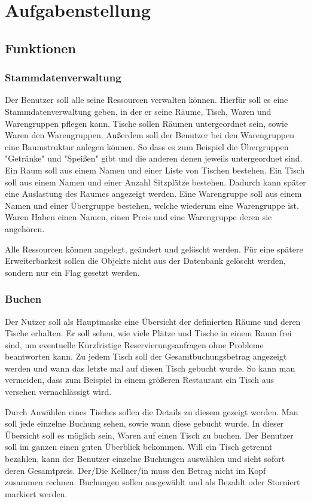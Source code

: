 \section{Aufgabenstellung}

\subsection{Funktionen}

\subsubsection{Stammdatenverwaltung}

Der Benutzer soll alle seine Ressourcen verwalten können. Hierfür soll es eine Stammdatenverwaltung geben, in der er seine Räume, Tisch, Waren und Warengruppen pflegen kann. Tische sollen Räumen untergeordnet sein, sowie Waren den Warengruppen. Außerdem soll der Benutzer bei den Warengruppen eine Baumstruktur anlegen können. So dass es zum Beispiel die Übergruppen "Getränke" und "Speißen" gibt und die anderen denen jeweils untergeordnet sind. Ein Raum soll aus einem Namen und einer Liste von Tischen bestehen. Ein Tisch soll aus einem Namen und einer Anzahl Sitzplätze bestehen. Dadurch kann später eine Auslastung des Raumes angezeigt werden. Eine Warengruppe soll aus einem Namen und einer Übergruppe bestehen, welche wiederum eine Warengruppe ist. Waren Haben einen Namen, einen Preis und eine Warengruppe deren sie angehören.

Alle Ressourcen können angelegt, geändert und gelöscht werden. Für eine spätere Erweiterbarkeit sollen die Objekte nicht aus der Datenbank gelöscht werden, sondern nur ein Flag gesetzt werden. 

\subsubsection{Buchen}

Der Nutzer soll als Hauptmaske eine Übersicht der definierten Räume und deren Tische erhalten. Er soll sehen, wie viele Plätze und Tische in einem Raum frei sind, um eventuelle Kurzfristige Reservierungsanfragen ohne Probleme beantworten kann. Zu jedem Tisch soll der Gesamtbuchungsbetrag angezeigt werden und wann das letzte mal auf diesen Tisch gebucht wurde. So kann man vermeiden, dass zum Beispiel in einem größeren Restaurant ein Tisch aus versehen vernachlässigt wird. 


Durch Anwählen eines Tisches sollen die Details zu diesem gezeigt werden. Man soll jede einzelne Buchung sehen, sowie wann diese gebucht wurde. In dieser Übersicht soll es möglich sein, Waren auf einen Tisch zu buchen. Der Benutzer soll im ganzen einen guten Überblick bekommen. Will ein Tisch getrennt bezahlen, kann der Benutzer einzelne Buchungen auswählen und sieht sofort deren Gesamtpreis. Der/Die Kellner/in muss den Betrag nicht im Kopf zusammen rechnen. Buchungen sollen ausgewählt und als Bezahlt oder Storniert markiert werden. 

